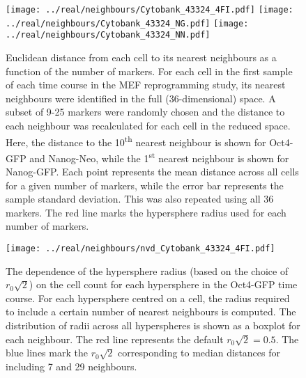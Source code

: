 \documentclass{article}
\begin{document}
\begin{figure}[p]
    \begin{center}
        \texttt{[image: ../real/neighbours/Cytobank\_43324\_4FI.pdf]}
        \texttt{[image: ../real/neighbours/Cytobank\_43324\_NG.pdf]}
        \texttt{[image: ../real/neighbours/Cytobank\_43324\_NN.pdf]}          
    \end{center}
    \caption{
        Euclidean distance from each cell to its nearest neighbours as a function of the number of markers.
        For each cell in the first sample of each time course in the MEF reprogramming study, its nearest neighbours were identified in the full (36-dimensional) space.
        A subset of 9-25 markers were randomly chosen and the distance to each neighbour was recalculated for each cell in the reduced space.
        Here, the distance to the 10\textsuperscript{th} nearest neighbour is shown for Oct4-GFP and Nanog-Neo, while the 1\textsuperscript{st} nearest neighbour is shown for Nanog-GFP.
        Each point represents the mean distance across all cells for a given number of markers, while the error bar represents the sample standard deviation.
        This was also repeated using all 36 markers.
        The red line marks the hypersphere radius used for each number of markers.
    }
    \label{fig:radius}
\end{figure}

\begin{figure}[p]
    \begin{center}
        \texttt{[image: ../real/neighbours/nvd\_Cytobank\_43324\_4FI.pdf]}
    \end{center}
    \caption{The dependence of the hypersphere radius (based on the choice of $r_0\sqrt{2}$) on the cell count for each hypersphere in the Oct4-GFP time course.
        For each hypersphere centred on a cell, the radius required to include a certain number of nearest neighbours is computed.
        The distribution of radii across all hyperspheres is shown as a boxplot for each neighbour.
        The red line represents the default $r_0\sqrt{2}=0.5$.
        The blue lines mark the $r_0\sqrt{2}$ corresponding to median distances for including 7 and 29 neighbours.
    }
    \label{fig:nvd}
\end{figure}
\end{document}
